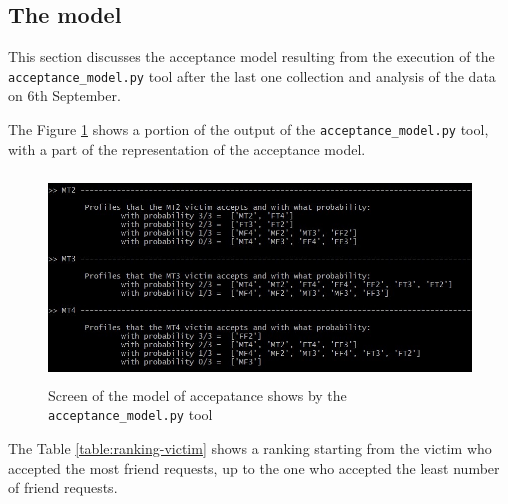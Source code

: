 \subsection{The model}
This section discusses the acceptance model resulting from the execution of the \texttt{acceptance\_model.py} tool after the last one collection and analysis of the data on 6th September.
\par \noindent
The Figure \ref{fig:model-screen} shows a portion of the output of the \texttt{acceptance\_model.py} tool, with a part of the representation of the acceptance model.
\label{cap:model-acceptance}
\begin{figure}[H]	
	\centering
	\includegraphics[height=5.5cm]{immagini/model-zero-effort.jpg}
	\caption{Screen of the model of accepatance shows by the \texttt{acceptance\_model.py} tool}
	\label{fig:model-screen}
\end{figure}
\newpage
\par \noindent
The Table \ref{table:ranking-victim} shows a ranking starting from the victim who accepted the most friend requests, up to the one who accepted the least number of friend requests.

